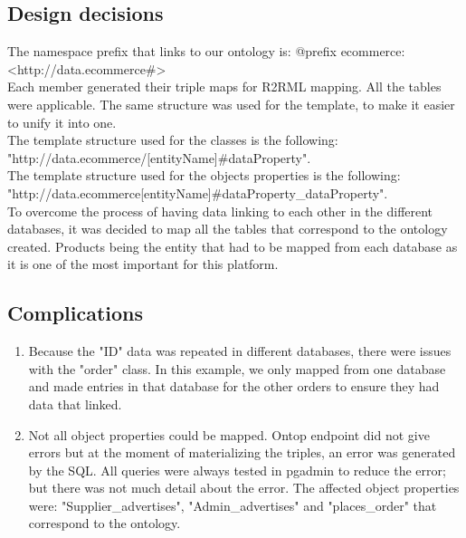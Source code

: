 \documentclass{article}
\begin{document}
\subsection{Design decisions}
The namespace prefix that links to our ontology is: @prefix ecommerce: \textless http://data.ecommerce\#\textgreater \\

Each member generated their triple maps for R2RML mapping. All the tables were applicable. The same structure was used for the template, to make it easier to unify it into one. \\

 The template structure used for the classes is the following: \\
"http://data.ecommerce/[entityName]\#{dataProperty}". \\

The template structure used for the objects properties is the following: \\
"http://data.ecommerce[entityName]\#{dataProperty}\_{dataProperty}". \\

To overcome the process of having data linking to each other in the different databases, it was decided to map all the tables that correspond to the ontology created. Products being the entity that had to be mapped from each database as it is one of the most important for this platform.



\subsection{Complications}

\begin{enumerate}
  \item Because the "ID" data was repeated in different databases, there were issues with the "order" class. In this example, we only mapped from one database and made entries in that database for the other orders to ensure they had data that linked.
  \item Not all object properties could be mapped. Ontop endpoint did not give errors but at the moment of materializing the triples, an error was generated by the SQL. All queries were always tested in pgadmin to reduce the error; but there was not much detail about the error. The affected object properties were: "Supplier\_advertises", "Admin\_advertises" and "places\_order" that correspond to the ontology.
\end{enumerate}
\end{document}
